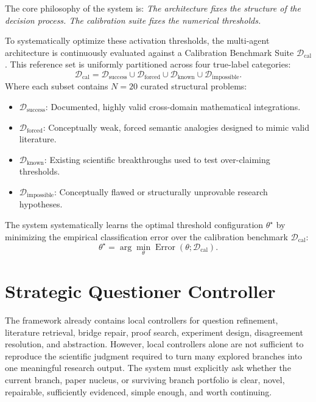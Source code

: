 \documentclass[11pt]{article}
\begin{document}
The core philosophy of the system is: \textit{The architecture fixes the structure of the decision process. The calibration suite fixes the numerical thresholds.}

To systematically optimize these activation thresholds, the multi-agent architecture is continuously evaluated against a Calibration Benchmark Suite $\mathcal{D}_{\text{cal}}$. This reference set is uniformly partitioned across four true-label categories:
$$
\mathcal{D}_{\text{cal}} = \mathcal{D}_{\text{success}} \cup \mathcal{D}_{\text{forced}} \cup \mathcal{D}_{\text{known}} \cup \mathcal{D}_{\text{impossible}}.
$$
Where each subset contains $N=20$ curated structural problems:
\begin{itemize}[leftmargin=*]
    \item $\mathcal{D}_{\text{success}}$: Documented, highly valid cross-domain mathematical integrations.
    \item $\mathcal{D}_{\text{forced}}$: Conceptually weak, forced semantic analogies designed to mimic valid literature.
    \item $\mathcal{D}_{\text{known}}$: Existing scientific breakthroughs used to test over-claiming thresholds.
    \item $\mathcal{D}_{\text{impossible}}$: Conceptually flawed or structurally unprovable research hypotheses.
\end{itemize}

The system systematically learns the optimal threshold configuration $\theta^\star$ by minimizing the empirical classification error over the calibration benchmark $\mathcal{D}_{\text{cal}}$:
$$
\theta^\star = \arg\min_{\theta} \operatorname{Error}(\theta;\mathcal{D}_{\text{cal}}).
$$




\section{Strategic Questioner Controller}

The framework already contains local controllers for question refinement, literature retrieval, bridge repair, proof search, experiment design, disagreement resolution, and abstraction. However, local controllers alone are not sufficient to reproduce the scientific judgment required to turn many explored branches into one meaningful research output. The system must explicitly ask whether the current branch, paper nucleus, or surviving branch portfolio is clear, novel, repairable, sufficiently evidenced, simple enough, and worth continuing.
\end{document}
